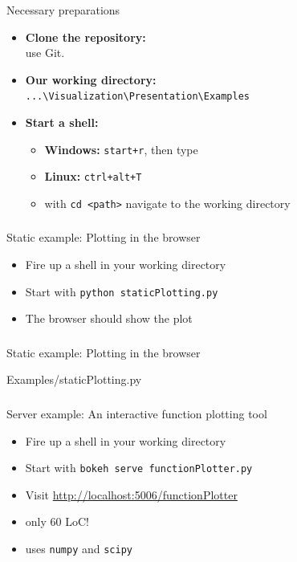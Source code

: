 \documentclass[11pt]{beamer}
\begin{document}
\begin{frame}
\frametitle{\insertsubsection}
\begin{block}{Necessary preparations}
\begin{itemize}
\item \textbf{Clone the repository:} \\
use Git.
\item \textbf{Our working directory:} \\
\texttt{...\textbackslash Visualization\textbackslash Presentation\textbackslash Examples}
\item \textbf{Start a shell:} 
\begin{itemize}
\item \textbf{Windows:} \texttt{start+r}, then type 
\item \textbf{Linux:} \texttt{ctrl+alt+T}
\item with \texttt{cd <path>} navigate to the working directory
\end{itemize}
\end{itemize}
\end{block}
\end{frame}

\begin{frame}[fragile]
\frametitle{\insertsubsection}
\begin{block}{Static example: Plotting in the browser}
\begin{itemize}
\item Fire up a shell in your working directory
\item Start with \texttt{python staticPlotting.py}
\item The browser should show the plot
\end{itemize}
\end{block}
\end{frame}

\begin{frame}[fragile]
\frametitle{\insertsubsection}
\begin{block}{Static example: Plotting in the browser}

{Examples/staticPlotting.py}
\end{block}
\end{frame}

\begin{frame}
\frametitle{\insertsubsection}
\begin{block}{Server example: An interactive function plotting tool}
\begin{itemize}
\item Fire up a shell in your working directory
\item Start with \texttt{bokeh serve functionPlotter.py}
\item Visit \url{http://localhost:5006/functionPlotter}
\pause
\item only 60 LoC!
\item uses \texttt{numpy} and \texttt{scipy}
\end{itemize}
\end{block}
\end{frame}
\end{document}
